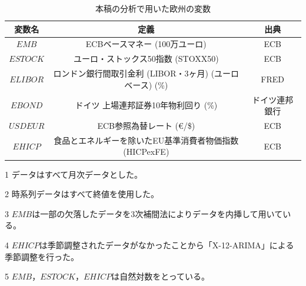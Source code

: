 \documentclass[12pt]{jarticle}
\begin{document}
{\begin{table}[H]
  \centering
  \caption{本稿の分析で用いた欧州の変数}
  \vspace{10pt}
  \begin{threeparttable}
    \begin{tabular}{ccc} \toprule[0.5pt]\toprule[0.5pt]
      変数名   & 定義                                                      & 出典           \\ \midrule[0.5pt]
      $EMB$    & ECBベースマネー (100万ユーロ)                             & ECB            \\
      $ESTOCK$ & ユーロ・ストックス50指数 (STOXX50)                        & ECB            \\
      $ELIBOR$ & ロンドン銀行間取引金利 (LIBOR・3ヶ月) (ユーロベース) (\%) & FRED           \\
      $EBOND$  & ドイツ 上場連邦証券10年物利回り (\%)                      & ドイツ連邦銀行 \\
      $USDEUR$ & ECB参照為替レート (\euro /\$)                             & ECB            \\
      $EHICP$  & 食品とエネルギーを除いたEU基準消費者物価指数 (HICPexFE)   & ECB            \\
      \bottomrule[0.5pt]\bottomrule[0.5pt]
    \end{tabular}
    \vspace{10pt}
    \begin{tablenotes}\footnotesize
      \item[1] データはすべて月次データとした。
      \item[2] 時系列データはすべて終値を使用した。
      \item[3] $EMB$は一部の欠落したデータを3次補間法によりデータを内挿して用いている。
      \item[4] $EHICP$は季節調整されたデータがなかったことから「X-12-ARIMA」による季節調整を行った。
      \item[5] $EMB，ESTOCK，EHICP$は自然対数をとっている。
    \end{tablenotes}
  \end{threeparttable}
\end{table}

}
\end{document}

